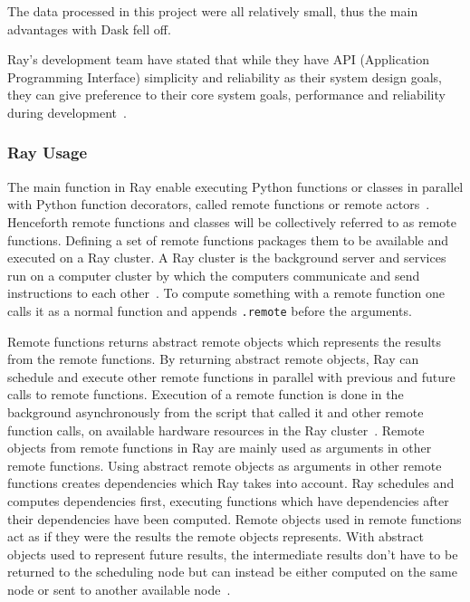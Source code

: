 \documentclass[12pt, a4paper]{article}
\begin{document}
The data processed in this project were all relatively small, thus the main advantages with Dask fell off.

Ray's development team have stated that while they have API (Application Programming Interface) simplicity and reliability as their system design goals, they can give preference to their core system goals, performance and reliability during development~\cite{ray:SystemDesign}.


\subsubsection{Ray Usage}

The main function in Ray enable executing Python functions or classes in parallel with Python function decorators, called remote functions or remote actors~\cite{ray:remoteFunctions, ray:remoteClasses}.
Henceforth remote functions and classes will be collectively referred to as remote functions.
Defining a set of remote functions packages them to be available and executed on a Ray cluster.
A Ray cluster is the background server and services run on a computer cluster by which the computers communicate and send instructions to each other~\cite{ray:rayCluster}.
To compute something with a remote function one calls it as a normal function and appends \texttt{.remote} before the arguments. 

Remote functions returns abstract remote objects which represents the results from the remote functions.
By returning abstract remote objects, Ray can schedule and execute other remote functions in parallel with previous and future calls to remote functions.
Execution of a remote function is done in the background asynchronously from the script that called it and other remote function calls, on available hardware resources in the Ray cluster~\cite{ray:remoteFunctions}.
Remote objects from remote functions in Ray are mainly used as arguments in other remote functions.
Using abstract remote objects as arguments in other remote functions creates dependencies which Ray takes into account.
Ray schedules and computes dependencies first, executing functions which have dependencies after their dependencies have been computed.
Remote objects used in remote functions act as if they were the results the remote objects represents.
With abstract objects used to represent future results, the intermediate results don't have to be returned to the scheduling node but can instead be either computed on the same node or sent to another available node~\cite{ray:remoteObjects}.
\end{document}
